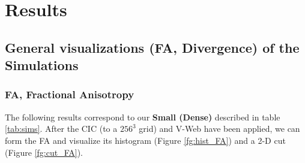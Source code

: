 \documentclass[12pt]{article}
\begin{document}
\section{Results}

\subsection{General visualizations (FA, Divergence) of the Simulations}

\subsubsection{FA, Fractional Anisotropy}
The following results correspond to our
 \textbf{Small (Dense)} described in table
  \ref{tab:sims}. After the CIC (to a $256^{3}$
   grid) and V-Web have been applied, we can form
    the FA and visualize its histogram (Figure
     \ref{fg:hist_FA}) and a 2-D cut (Figure
      \ref{fg:cut_FA}).
\end{document}

